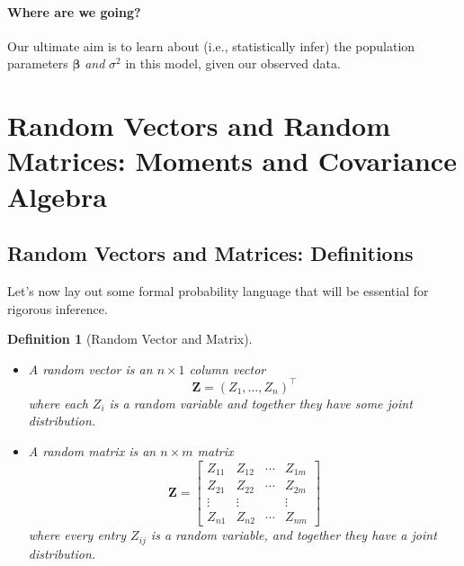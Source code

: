 \documentclass[12pt]{article}
\newtheorem{definition}{Definition}[section]
\begin{document}
\paragraph{Where are we going?} Our ultimate aim is to learn about (i.e., statistically infer) the population parameters $\boldsymbol{\beta}$ \emph{and} $\sigma^2$ in this model, given our observed data.

\medskip

\section{Random Vectors and Random Matrices: Moments and Covariance Algebra}

\subsection{Random Vectors and Matrices: Definitions}

Let's now lay out some formal probability language that will be essential for rigorous inference.

\begin{definition}[Random Vector and Matrix]
\leavevmode
\begin{itemize}
    \item A \emph{random vector} is an $n \times 1$ column vector
    \[
        \boldsymbol{Z} = (Z_1, \ldots, Z_n)^\top
    \]
    where each $Z_i$ is a random variable and together they have some joint distribution.
    \item A \emph{random matrix} is an $n \times m$ matrix
    \[
    \boldsymbol{Z} =
    \begin{bmatrix}
    Z_{11} & Z_{12} & \cdots & Z_{1m} \\
    Z_{21} & Z_{22} & \cdots & Z_{2m} \\
    \vdots & \vdots &        & \vdots \\
    Z_{n1} & Z_{n2} & \cdots & Z_{nm}
    \end{bmatrix}
    \]
    where every entry $Z_{ij}$ is a random variable, and together they have a joint distribution.
\end{itemize}
\end{definition}
\end{document}
